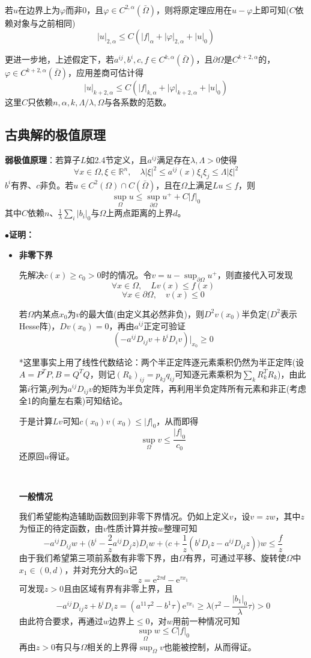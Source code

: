 \documentclass[a4paper,UTF8,fontset=windows,AutoFakeBold]{ctexart}
\newcommand*{\er}{\mathrm{e}}
\newcommand{\proo}[1]{{\kaishu $\bullet$\textbf{证明：}
\begin{itemize}
    \item[] #1
\end{itemize}
}}
\begin{document}
\

若$u$在边界上为$\varphi$而非0，且$\varphi\in C^{2,\alpha}(\bar\Omega)$，则将原定理应用在$u-\varphi$上即可知($C$依赖对象与之前相同)
$$|u|_{2,\alpha}\le C(|f|_\alpha+|\varphi|_{2,\alpha}+|u|_0)$$

更进一步地，上述假定下，若$a^{ij},b^i,c,f\in C^{k,\alpha}(\bar\Omega)$，且$\partial\Omega$是$C^{k+2,\alpha}$的，$\varphi\in C^{k+2,\alpha}(\bar\Omega)$，应用差商可估计得
$$|u|_{k+2,\alpha}\le C(|f|_{k,\alpha}+|\varphi|_{k+2,\alpha}+|u|_0)$$
这里$C$只依赖$n,\alpha,k,\Lambda/\lambda,\Omega$与各系数的范数。

\subsection{古典解的极值原理}
\textbf{弱极值原理}：若算子$L$如2.4节定义，且$a^{ij}$满足存在$\lambda,\Lambda>0$使得
$$\forall x\in\Omega,\xi\in\mathbb{R}^n,\quad\lambda|\xi|^2\le a^{ij}(x)\xi_i\xi_j\le\Lambda|\xi|^2$$
$b^i$有界、$c$非负。若$u\in C^2(\Omega)\cap C(\bar\Omega)$，且在$\Omega$上满足$Lu\le f$，则
$$\sup_\Omega u\le\sup_{\partial\Omega}u^++C|f|_0$$
其中$C$依赖$n$、$\frac{1}{\lambda}\sum_i|b_i|_0$与$\Omega$上两点距离的上界$d$。

\proo{
    \textbf{非零下界}

    先解决$c(x)\ge c_0>0$时的情况。令$v=u-\sup_{\partial\Omega}u^+$，则直接代入可发现
    $$\forall x\in\Omega,\quad Lv(x)\le f(x)$$
    $$\forall x\in\partial\Omega,\quad v(x)\le 0$$

    若$\Omega$内某点$x_0$为$v$的最大值(由定义其必然非负)，则$D^2v(x_0)$半负定($D^2$表示Hesse阵)，$Dv(x_0)=0$，再由$a^{ij}$正定可验证
    $$(-a^{ij}D_{ij}v+b^iD_iv)\big|_{x_0}\ge0$$

    *这里事实上用了线性代数结论：两个半正定阵逐元素乘积仍然为半正定阵(设$A=P^TP,B=Q^TQ$，则记$(R_k)_{ij}=p_{kj}q_{ij}$可知逐元素乘积为$\sum_kR_k^TR_k$)，由此第$i$行第$j$列为$a^{ij}D_{ij}v$的矩阵为半负定阵，再利用半负定阵所有元素和非正(考虑全1的向量左右乘)可知结论。

    于是计算$Lv$可知$c(x_0)v(x_0)\le|f|_0$，从而即得
    $$\sup_\Omega v\le\frac{|f|_0}{c_0}$$
    还原回$u$得证。   

    \

    \textbf{一般情况}

    我们希望能构造辅助函数回到非零下界情况。仍如上定义$v$，设$v=zw$，其中$z$为恒正的待定函数，由$v$性质计算并按$w$整理可知
    $$-a^{ij}D_{ij}w+\bigg(b^i-\frac{2}{z}a^{ij}D_jz\bigg)D_iw+\bigg(c+\frac{1}{z}(b^iD_iz-a^{ij}D_{ij}z)\bigg)w\le\frac{f}{z}$$
    由于我们希望第三项前系数有非零下界，由$\Omega$有界，可通过平移、旋转使$\Omega$中$x_1\in(0,d)$，并对充分大的$\alpha$记
    $$z=\er^{2\tau d}-\er^{\tau x_1}$$
    可发现$z>0$且由区域有界有非零上界，且
    $$-a^{ij}D_{ij}z+b^iD_iz=(a^{11}\tau^2-b^1\tau)\er^{\tau x_1}\ge\lambda\bigg(\tau^2-\frac{|b_1|_0}{\lambda}\tau\bigg)>0$$
    由此符合要求，再通过$w$边界上$\le0$，对$w$用前一种情况可知
    $$\sup_\Omega w\le C|f|_0$$
    再由$z>0$有只与$\Omega$相关的上界得$\sup_\Omega v$也能被控制，从而得证。
}
\end{document}
